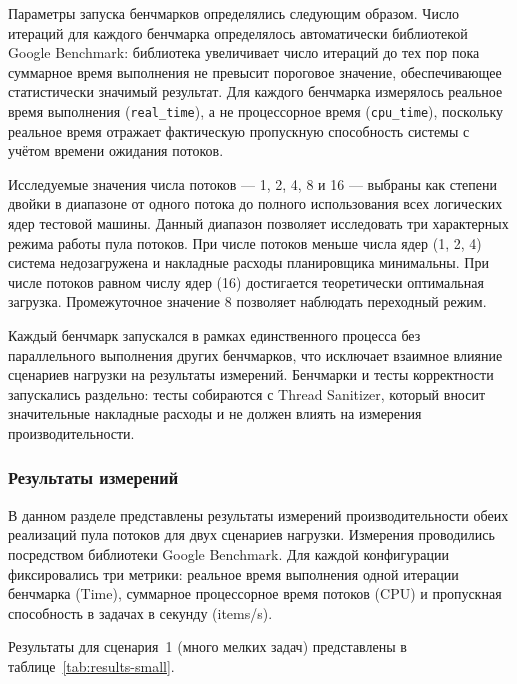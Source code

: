 Параметры запуска бенчмарков определялись следующим образом.
Число итераций для каждого бенчмарка определялось автоматически
библиотекой Google Benchmark: библиотека увеличивает число
итераций до тех пор пока суммарное время выполнения не превысит
пороговое значение, обеспечивающее статистически значимый
результат. Для каждого бенчмарка измерялось реальное время
выполнения (\texttt{real\_time}), а не процессорное время
(\texttt{cpu\_time}), поскольку реальное время отражает
фактическую пропускную способность системы с учётом времени
ожидания потоков.

Исследуемые значения числа потоков --- 1, 2, 4, 8 и 16 ---
выбраны как степени двойки в диапазоне от одного потока до
полного использования всех логических ядер тестовой машины.
Данный диапазон позволяет исследовать три характерных режима
работы пула потоков. При числе потоков меньше числа ядер
(1, 2, 4) система недозагружена и накладные расходы планировщика
минимальны. При числе потоков равном числу ядер (16) достигается
теоретически оптимальная загрузка. Промежуточное значение 8
позволяет наблюдать переходный режим.

Каждый бенчмарк запускался в рамках единственного процесса
без параллельного выполнения других бенчмарков, что исключает
взаимное влияние сценариев нагрузки на результаты измерений.
Бенчмарки и тесты корректности запускались раздельно: тесты
собираются с Thread Sanitizer, который вносит значительные
накладные расходы и не должен влиять на измерения
производительности.

\subsubsection{Результаты измерений}
\label{subsubsec:bench-results}

В данном разделе представлены результаты измерений
производительности обеих реализаций пула потоков для двух
сценариев нагрузки. Измерения проводились посредством библиотеки
Google Benchmark. Для каждой конфигурации фиксировались три
метрики: реальное время выполнения одной итерации бенчмарка
(Time), суммарное процессорное время потоков (CPU) и пропускная
способность в задачах в секунду (items/s).

Результаты для сценария~1 (много мелких задач) представлены
в таблице~\ref{tab:results-small}.


